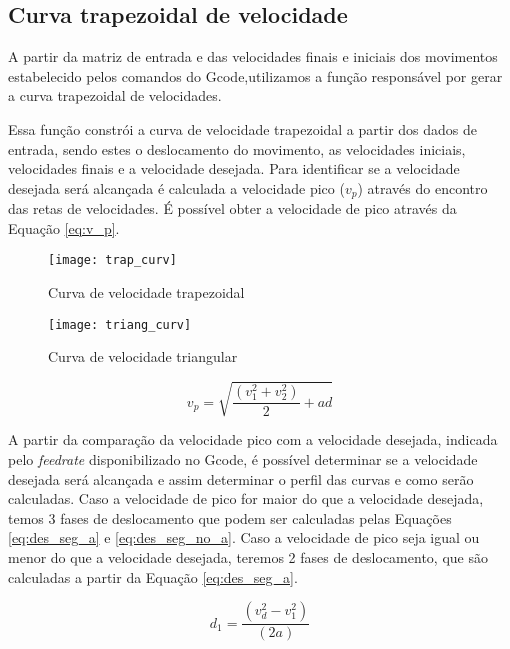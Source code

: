 \subsection{Curva trapezoidal de velocidade}

A partir da matriz de entrada e das velocidades finais e iniciais dos movimentos estabelecido pelos comandos do Gcode,utilizamos a função responsável por gerar a curva trapezoidal de velocidades.

Essa função constrói a curva de velocidade trapezoidal a partir dos dados de entrada, sendo estes o deslocamento do movimento, as velocidades iniciais, velocidades finais e a velocidade desejada. Para identificar se a velocidade desejada será alcançada é calculada a velocidade pico ($v_p$) através do encontro das retas de velocidades. É possível obter a velocidade de pico através da Equação \ref{eq:v_p}.

\begin{figure}[H]
    \centering
    \caption{Curva de velocidade trapezoidal}
    \texttt{[image: trap\_curv]}

    \label{fig:trap_curv}
\end{figure}

\begin{figure}[H]
    \centering
    \caption{Curva de velocidade triangular}
    \texttt{[image: triang\_curv]}

    \label{fig:triang_curv}
\end{figure}

\begin{equation}
    \label{eq:v_p}
    v_p = \sqrt{\frac{(v_1^2+v_2^2)}{2}+a d}
\end{equation}

A partir da comparação da velocidade pico com a velocidade desejada, indicada pelo \textit{feedrate} disponibilizado no Gcode, é possível determinar se a velocidade desejada será alcançada e assim determinar o perfil das curvas e como serão calculadas. Caso a velocidade de pico for maior do que a velocidade desejada, temos 3 fases de deslocamento que podem ser calculadas pelas Equações \ref{eq:des_seg_a} e \ref{eq:des_seg_no_a}. Caso a velocidade de pico seja igual ou menor do que a velocidade desejada, teremos 2 fases de deslocamento, que são calculadas a partir da Equação \ref{eq:des_seg_a}.

\begin{equation}
    \label{eq:des_seg_a}
    d_1 = \frac{(v_d^2-v_1^2)}{(2 a)}
\end{equation}

